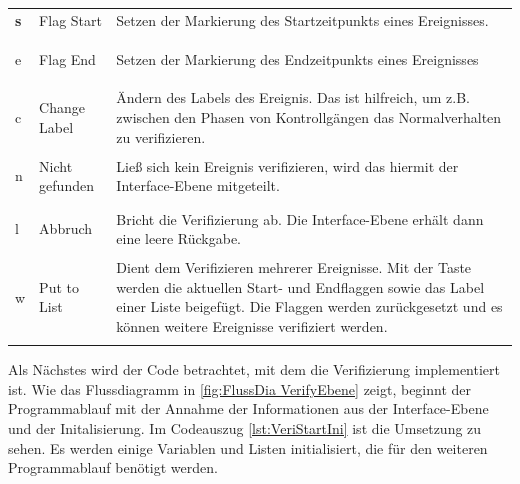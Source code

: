\begin{longtable}{>{\bfseries} p{} p{} p{}}
s & Flag Start & Setzen der Markierung des Startzeitpunkts eines Ereignisses. \\
\addlinespace[0.7em] %

e & Flag End &  Setzen der Markierung des Endzeitpunkts eines Ereignisses \\
\addlinespace[0.7em] %

c & Change Label & Ändern des Labels des Ereignis. Das ist hilfreich, um z.B. zwischen den Phasen von Kontrollgängen das Normalverhalten zu verifizieren. \\
\addlinespace[0.7em] %

n & Nicht gefunden & Ließ sich kein Ereignis verifizieren, wird das hiermit der Interface-Ebene mitgeteilt. \\
\addlinespace[0.7em] %

l & Abbruch & Bricht die Verifizierung ab. Die Interface-Ebene erhält dann eine leere Rückgabe. \\
\addlinespace[0.7em] %

w & Put to List & Dient dem Verifizieren mehrerer Ereignisse. Mit der Taste werden die aktuellen Start- und Endflaggen sowie das Label einer Liste beigefügt. Die Flaggen werden zurückgesetzt und es können weitere Ereignisse verifiziert werden.\\
\addlinespace[0.7em] %

\end{longtable}

Als Nächstes wird der Code betrachtet, mit dem die Verifizierung implementiert ist. Wie das Flussdiagramm in \autoref{fig:FlussDia VerifyEbene} zeigt, beginnt der Programmablauf mit der Annahme der Informationen aus der Interface-Ebene und der Initalisierung. Im Codeauszug \ref{lst:VeriStartIni} ist die Umsetzung zu sehen. Es werden einige Variablen und Listen initialisiert, die für den weiteren Programmablauf benötigt werden.

